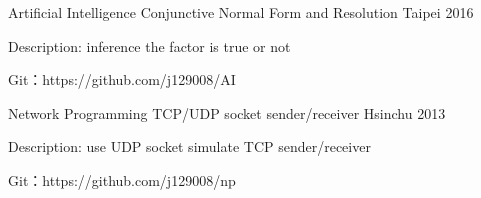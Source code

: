 
\begin{cventries}

  \cventry
    {Artificial Intelligence}
    {Conjunctive Normal Form and Resolution}
    {Taipei} %
    {2016} %
    {
      \begin{cvitems} %
        \item {Description: inference the factor is true or not}
        \item {Git：https://github.com/j129008/AI}
      \end{cvitems}
    }


  \cventry
    {Network Programming}
    {TCP/UDP socket sender/receiver}
    {Hsinchu} %
    {2013} %
    {
      \begin{cvitems} %
        \item {Description: use UDP socket simulate TCP sender/receiver}
        \item {Git：https://github.com/j129008/np}
      \end{cvitems}
    }

\end{cventries}

